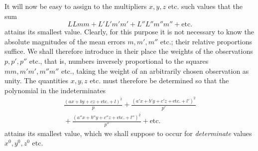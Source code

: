 It will now be easy to assign to the multipliers \(x,y,z\) etc. such values that the sum
\[
LLmm+L'L'm'm'+L''L''m''m''+\text{etc.}
\]
attains its smallest value. Clearly, for this purpose it is not necessary to know the absolute magnitudes of the mean errors \(m,m',m''\) etc.; their relative proportions suffice. We shall therefore introduce in their place the weights of the observations \(p,p',p''\) etc., that is, numbers inversely proportional to the squares \(mm,m'm',m''m''\) etc., taking the weight of an arbitrarily chosen observation as unity. The quantities \(x,y,z\) etc. must therefore be determined so that the polynomial in the indeterminates
\[
\begin{gathered}
\frac{(ax+by+cz+\text{etc.}+l)^2}{p}+\frac{(a'x+b'y+c'z+\text{etc.}+l')^2}{p'}\\[4pt]
{}+\frac{(a''x+b''y+c''z+\text{etc.}+l'')^2}{p''}+\text{etc.}
\end{gathered}
\]
attains its smallest value, which we shall suppose to occur for \textit{determinate} values \(x^0,y^0,z^0\) etc.

